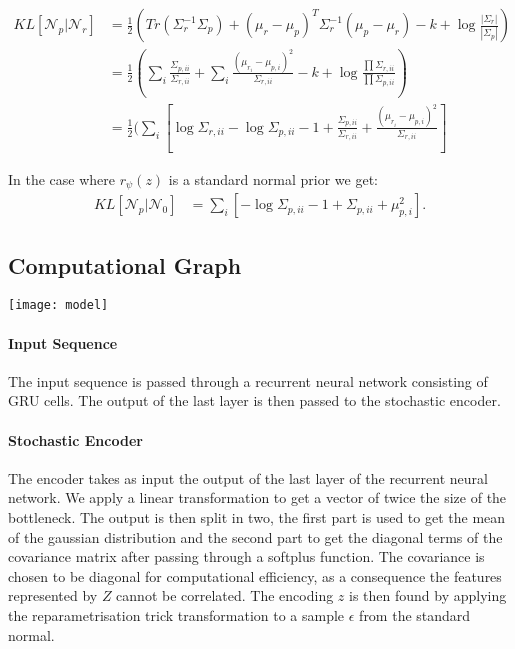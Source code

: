 \documentclass[11pt,oneside,openright]{report}
\begin{document}
\begin{align}
KL[\mathcal{N}_p| \mathcal{N}_r] &= \frac{1}{2}(Tr(\Sigma_r^{-1}\Sigma_p) + (\mu_r - \mu_p)^T\Sigma_r^{-1}(\mu_p - \mu_r) - k + \log\frac{|\Sigma_r|}{|\Sigma_p|})\\
&= \frac{1}{2}(\sum_i \frac{\Sigma_{p, ii}}{\Sigma_{r, ii}} + \sum_i \frac{(\mu_{r_i} - \mu_{p, i})^2}{\Sigma_{r, ii}} - k + \log\frac{\prod \Sigma_{r, ii}}{\prod \Sigma_{p, ii}})\\
&= \frac{1}{2}(\sum_i[ \log \Sigma_{r, ii} - \log \Sigma_{p, ii} - 1 + \frac{\Sigma_{p, ii}}{\Sigma_{r, ii}} + \frac{(\mu_{r_i} - \mu_{p, i})^2}{\Sigma_{r, ii}}]
\end{align}

In the case where $r_\psi(z)$ is a standard normal prior we get:
\begin{align}
KL[\mathcal{N}_p | \mathcal{N}_0] &= \sum_i[ -\log \Sigma_{p, ii} - 1 + \Sigma_{p, ii}+ \mu_{p, i}^2]
\label{eq:kl}.
\end{align}

\subsection{Computational Graph}
\begin{center}
\texttt{[image: model]}
\end{center}

\paragraph{Input Sequence}
The input sequence is passed through a recurrent neural network consisting of GRU cells. The output of the last layer is then passed to the stochastic encoder.

\paragraph{Stochastic Encoder}
The encoder takes as input the output of the last layer of the recurrent neural network. We apply a linear transformation to get a vector of twice the size of the bottleneck. The output is then split in two, the first part is used to get the mean of the gaussian distribution and the second part to get the diagonal terms of the covariance matrix after passing through a softplus function. The covariance is chosen to be diagonal for computational efficiency, as a consequence the features represented by $Z$ cannot be correlated. The encoding $z$ is then found by applying the reparametrisation trick transformation to a sample $\epsilon$ from the standard normal.
\end{document}
